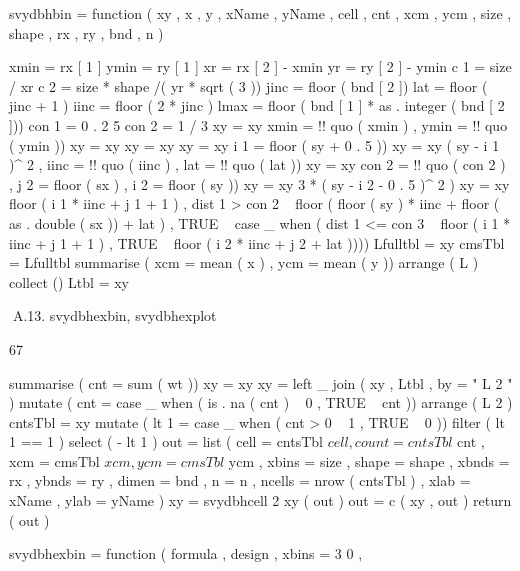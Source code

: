 svydbhbin = function ( xy , x , y , xName , yName , cell ,
cnt , xcm , ycm , size , shape , rx , ry , bnd , n ) {
xmin = rx [ 1 ]
ymin = ry [ 1 ]
xr = rx [ 2 ] - xmin
yr = ry [ 2 ] - ymin
c 1 = size / xr
c 2 = size * shape /( yr * sqrt ( 3 ))
jinc = floor ( bnd [ 2 ])
lat = floor ( jinc + 1 )
iinc = floor ( 2 * jinc )
lmax = floor ( bnd [ 1 ] * as . integer ( bnd [ 2 ]))
con 1 = 0 . 2 5
con 2 = 1 / 3
xy = xy %
xmin = !! quo ( xmin ) , ymin = !! quo ( ymin ))
xy = xy %
xy = xy %
xy = xy %
i 1 = floor ( sy + 0 . 5 ))
xy = xy %
( sy - i 1 )^ 2 , iinc = !! quo ( iinc ) , lat = !! quo ( lat ))
xy = xy %
con 2 = !! quo ( con 2 ) , j 2 = floor ( sx ) ,
i 2 = floor ( sy ))
xy = xy %
3 * ( sy - i 2 - 0 . 5 )^ 2 )
xy = xy %
floor ( i 1 * iinc + j 1 + 1 ) , dist 1 > con 2 ~
floor ( floor ( sy ) * iinc + floor ( as . double ( sx )) +
lat ) , TRUE ~ case _ when ( dist 1 <= con 3 ~
floor ( i 1 * iinc + j 1 + 1 ) , TRUE ~ floor ( i 2 *
iinc + j 2 + lat ))))
Lfulltbl = xy %
cmsTbl = Lfulltbl %
summarise ( xcm = mean ( x ) , ycm = mean ( y )) %
arrange ( L ) %
collect ()
Ltbl = xy %

A.13. svydbhexbin, svydbhexplot

67

summarise ( cnt = sum ( wt ))
xy = xy %
xy = left _ join ( xy , Ltbl , by = " L 2 " ) %
mutate ( cnt = case _ when ( is . na ( cnt ) ~
0 , TRUE ~ cnt )) %
arrange ( L 2 )
cntsTbl = xy %
mutate ( lt 1 = case _ when ( cnt > 0 ~ 1 , TRUE ~ 0 )) %
filter ( lt 1 == 1 ) %
select ( - lt 1 ) %
out = list ( cell = cntsTbl $ cell , count = cntsTbl $ cnt ,
xcm = cmsTbl $ xcm , ycm = cmsTbl $ ycm , xbins = size ,
shape = shape , xbnds = rx , ybnds = ry ,
dimen = bnd , n = n , ncells = nrow ( cntsTbl ) ,
xlab = xName , ylab = yName )
xy = svydbhcell 2 xy ( out )
out = c ( xy , out )
return ( out )
}
svydbhexbin = function ( formula , design , xbins = 3 0 ,
